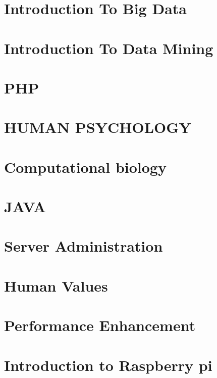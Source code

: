 \documentclass[12pt]{report}
\begin{document}

\begin{screen}
\ppttitle
\end{screen}
\footskip 0.7cm
\thispagestyle{empty}
\pagetitle
\newpage
{}
\cfoot{\thepage}



\newpage
\tableofcontents
\newpage


\cfoot{\thepage}

\newpage
\chapter{Introduction To Big Data}

\newpage

\chapter{Introduction To Data Mining}

\newpage

\chapter{PHP}

\newpage

\chapter{HUMAN PSYCHOLOGY}

\newpage

\chapter{Computational biology}

\newpage

\chapter{JAVA}

\newpage

\chapter{Server Administration}

\newpage

\chapter{Human Values}

\newpage

\chapter{Performance Enhancement}

\newpage

\chapter{Introduction to Raspberry pi}

\end{document}

